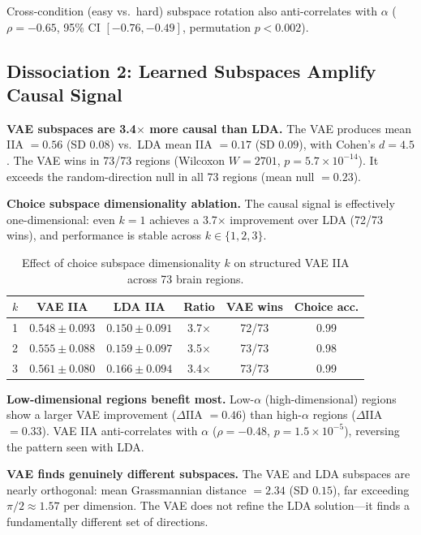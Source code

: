 \documentclass{article}
\begin{document}
Cross-condition (easy vs.\ hard) subspace rotation also anti-correlates with $\alpha$ ($\rho = -0.65$, 95\% CI $[-0.76, -0.49]$, permutation $p < 0.002$).

\subsection{Dissociation 2: Learned Subspaces Amplify Causal Signal}

\textbf{VAE subspaces are 3.4$\times$ more causal than LDA.} The VAE produces mean IIA $= 0.56$ (SD $0.08$) vs.\ LDA mean IIA $= 0.17$ (SD $0.09$), with Cohen's $d = 4.5$. The VAE wins in 73/73 regions (Wilcoxon $W = 2701$, $p = 5.7 \times 10^{-14}$). It exceeds the random-direction null in all 73 regions (mean null $= 0.23$).

\textbf{Choice subspace dimensionality ablation.} The causal signal is effectively one-dimensional: even $k = 1$ achieves a 3.7$\times$ improvement over LDA (72/73 wins), and performance is stable across $k \in \{1, 2, 3\}$.

\begin{table}[h]
\centering
\small
\caption{Effect of choice subspace dimensionality $k$ on structured VAE IIA across 73 brain regions.}
\label{tab:vae_k_ablation}
\begin{tabular}{lccccc}
\toprule
$k$ & VAE IIA & LDA IIA & Ratio & VAE wins & Choice acc. \\
\midrule
1 & $0.548 \pm 0.093$ & $0.150 \pm 0.091$ & 3.7$\times$ & 72/73 & 0.99 \\
2 & $0.555 \pm 0.088$ & $0.159 \pm 0.097$ & 3.5$\times$ & 73/73 & 0.98 \\
3 & $0.561 \pm 0.080$ & $0.166 \pm 0.094$ & 3.4$\times$ & 73/73 & 0.99 \\
\bottomrule
\end{tabular}
\end{table}

\textbf{Low-dimensional regions benefit most.} Low-$\alpha$ (high-dimensional) regions show a larger VAE improvement ($\Delta$IIA $= 0.46$) than high-$\alpha$ regions ($\Delta$IIA $= 0.33$). VAE IIA anti-correlates with $\alpha$ ($\rho = -0.48$, $p = 1.5 \times 10^{-5}$), reversing the pattern seen with LDA.

\textbf{VAE finds genuinely different subspaces.} The VAE and LDA subspaces are nearly orthogonal: mean Grassmannian distance $= 2.34$ (SD $0.15$), far exceeding $\pi/2 \approx 1.57$ per dimension. The VAE does not refine the LDA solution---it finds a fundamentally different set of directions.
\end{document}
